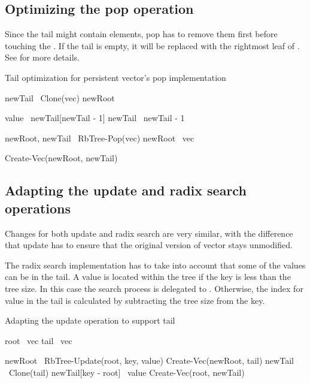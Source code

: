 \subsection*{Optimizing the pop operation}

Since the tail might contain elements, pop has to remove them first before touching the \rbtree. If the tail is empty, it will be replaced with the rightmost leaf of \rbtree. See  for more details. 

\begin{listing}[ht!]
    \caption{Tail optimization for persistent vector’s pop implementation}
    \label{lst:pvec-pop}
    
    \begin{algorithmic}
        
        \State newTail \la\ Clone(vec)
        \State newRoot \la\ \nil{}

        \State value \la\ newTail[newTail - 1]
        \State newTail \la\ newTail - 1     
            
            \State newRoot, newTail \la\ RbTree-Pop(vec)            
        \Else 
            \State newRoot \la\ vec
        \EndIf
        
        \State \Return Create-Vec(newRoot, newTail)
        \EndFunction
    \end{algorithmic}
\end{listing}

\subsection*{Adapting the update and radix search operations}
Changes for both update and radix search are very similar, with the difference that update has to ensure that the original version of vector stays unmodified. 

The radix search implementation has to take into account that some of the values can be in the tail. A value is located within the tree if the key is less than the tree size. In this case the search process is delegated to \rbtree. Otherwise, the index for value in the tail is calculated by subtracting the tree size from the key. 

\begin{listing}[ht!]
    \caption{Adapting the update operation to support tail}
    \label{lst:pvec-update}
    
    \begin{algorithmic}

        \State root \la\ vec
        \State tail \la\ vec

            \State newRoot \la\ RbTree-Update(root, key, value)
            \State \Return Create-Vec(newRoot, tail)
        \Else
            \State newTail \la\ Clone(tail)
            \State newTail[key - root] \la\ value
            \State \Return Create-Vec(root, newTail)
        \EndIf        
        \EndFunction
    \end{algorithmic}
\end{listing}

